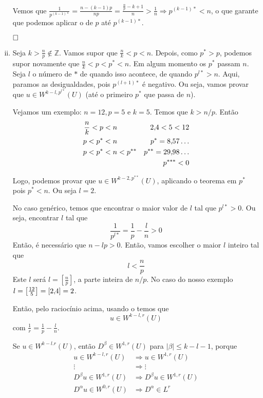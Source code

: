 \documentclass[11pt]{article}
\newcommand{\qed}{$\hfill\square$}
\newcommand{\Z}{\mathbb{Z}}
\renewcommand{\v}{,\hspace{-2pt}}
\begin{document}
\begin{enumerate}[(i)]
	Vemos que $ \frac{1}{p^{(k-1)*}} = \frac{n-(k-1)p}{np} = \frac{\frac{n}{p} - k + 1}{n} > \frac{1}{n} \Rightarrow p^{(k-1)*} < n$, o que garante que podemos aplicar o  de $p$ até $p^{(k-1)*}$.
	
	\qed
	
	
	\item Seja $k > \frac{n}{p} \notin \Z$. Vamos supor que $\frac{n}{k} < p < n$. Depois, como $p^* > p$, podemos supor novamente que $\frac{n}{k} < p < p^* < n$. Em algum momento os $p^*$ passam $n$. Seja $l$ o número de $*$ de quando isso acontece, de quando $p^{l*}>n$. Aqui, paramos as desigualdades, pois $p^{(l+1)*}$ é negativo. Ou seja, vamos provar que $u \in W^{k-l,p^{l*}}(U)$ (até o primeiro $p^*$ que passa de $n$).
	
	Vejamos um exemplo: $n=12, p=5$ e $k=5$. Temos que $k>n/p$. Então \begin{align*}
		\frac{n}{k} < p &< n & 2\v4 < 5 < 12\\
		p < p^* &< n & p^* = 8\v57\ldots\\
		p < p^* &< n < p^{**} & p^{**} = 29\v98\ldots \\
		&& p^{***} < 0 
	\end{align*}

	Logo, podemos provar que $u \in W^{k-2, p^{**}}(U)$, aplicando o teorema em $p^*$ pois $p^* < n$. Ou seja $l=2$.
	
	No caso genérico, temos que encontrar o maior valor de $l$ tal que $p^{l*}>0$. Ou seja, encontrar $l$ tal que \[ \frac{1}{p^{l*}} = \frac{1}{p} - \frac{l}{n} > 0  \] Então, é necessário que $n - lp >0$. Então, vamos escolher o maior $l$ inteiro tal que \[ l < \frac{n}{p} \] Este $l$ será $l= \left[\frac{n}{p}\right]$, a parte inteira de $n/p$. No caso do nosso exemplo $l=\left[\frac{12}{5}\right] = \left[2\v 4\right] = 2$.
	
	Então, pelo raciocínio acima, usando o  temos que \[  u \in W^{k-l,r}(U)   \]com $ \frac{1}{r} = \frac{1}{p} - \frac{l}{n} $.
	
	Se $u \in W^{k-l. r}(U)$, então $D^\beta \in W^{1,r}(U)$ para $|\beta|\leq k-l-1$, porque \begin{align*}
		u \in W^{k-l,r}(U) &\Rightarrow u \in W^{1,r}(U)\\
		\vdots & \Rightarrow \vdots \\
		D^\beta u \in W^{1,r}(U) &\Rightarrow D^\beta u \in W^{1,r}(U) \\
		D^\alpha u \in W^{0,r}({U}) &\Rightarrow D^\alpha \in L^r 
	\end{align*}


\end{enumerate}
\end{document}
